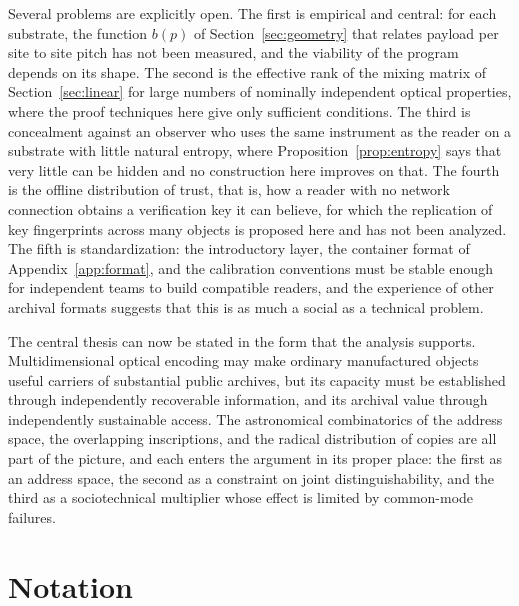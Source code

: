 Several problems are explicitly open. The first is empirical and central: for each substrate, the function $b(p)$ of Section~\ref{sec:geometry} that relates payload per site to site pitch has not been measured, and the viability of the program depends on its shape. The second is the effective rank of the mixing matrix of Section~\ref{sec:linear} for large numbers of nominally independent optical properties, where the proof techniques here give only sufficient conditions. The third is concealment against an observer who uses the same instrument as the reader on a substrate with little natural entropy, where Proposition~\ref{prop:entropy} says that very little can be hidden and no construction here improves on that. The fourth is the offline distribution of trust, that is, how a reader with no network connection obtains a verification key it can believe, for which the replication of key fingerprints across many objects is proposed here and has not been analyzed. The fifth is standardization: the introductory layer, the container format of Appendix~\ref{app:format}, and the calibration conventions must be stable enough for independent teams to build compatible readers, and the experience of other archival formats suggests that this is as much a social as a technical problem.

The central thesis can now be stated in the form that the analysis supports. Multidimensional optical encoding may make ordinary manufactured objects useful carriers of substantial public archives, but its capacity must be established through independently recoverable information, and its archival value through independently sustainable access. The astronomical combinatorics of the address space, the overlapping inscriptions, and the radical distribution of copies are all part of the picture, and each enters the argument in its proper place: the first as an address space, the second as a constraint on joint distinguishability, and the third as a sociotechnical multiplier whose effect is limited by common-mode failures.

\appendix

\section{Notation}\label{app:notation}

